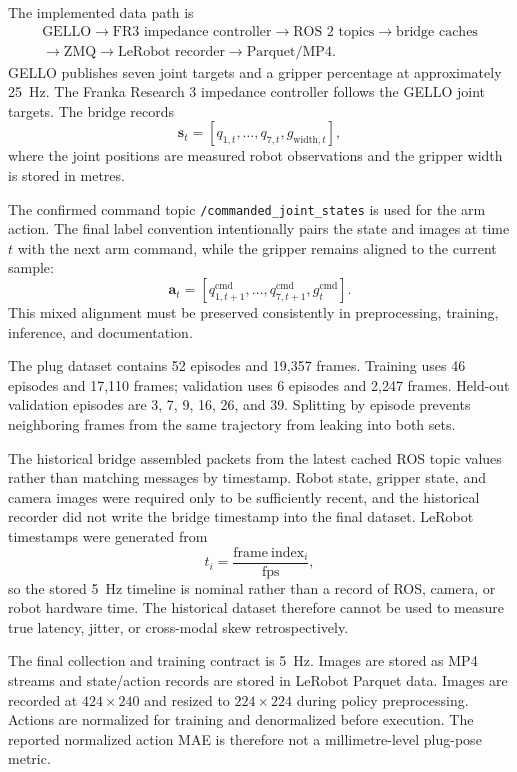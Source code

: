 \documentclass[12pt, letterpaper]{article}
\begin{document}
The implemented data path is
\begin{multline*}
\text{GELLO}
\rightarrow
\text{FR3 impedance controller}
\rightarrow
\text{ROS 2 topics}
\rightarrow
\text{bridge caches}
\\
\rightarrow
\text{ZMQ}
\rightarrow
\text{LeRobot recorder}
\rightarrow
\text{Parquet/MP4}.
\end{multline*}
GELLO publishes seven joint targets and a gripper percentage at approximately 25~Hz. The Franka Research 3 impedance controller follows the GELLO joint targets. The bridge records
\[
\mathbf s_t=[q_{1,t},\ldots,q_{7,t},g_{\mathrm{width},t}],
\]
where the joint positions are measured robot observations and the gripper width is stored in metres.

The confirmed command topic \texttt{/commanded\_joint\_states} is used for the arm action. The final label convention intentionally pairs the state and images at time \(t\) with the next arm command, while the gripper remains aligned to the current sample:
\[
\mathbf a_t=
[q^{\mathrm{cmd}}_{1,t+1},\ldots,
q^{\mathrm{cmd}}_{7,t+1},
g^{\mathrm{cmd}}_{t}].
\]
This mixed alignment must be preserved consistently in preprocessing, training, inference, and documentation.

The plug dataset contains 52 episodes and 19,357 frames. Training uses 46 episodes and 17,110 frames; validation uses 6 episodes and 2,247 frames. Held-out validation episodes are 3, 7, 9, 16, 26, and 39. Splitting by episode prevents neighboring frames from the same trajectory from leaking into both sets.

The historical bridge assembled packets from the latest cached ROS topic values rather than matching messages by timestamp. Robot state, gripper state, and camera images were required only to be sufficiently recent, and the historical recorder did not write the bridge timestamp into the final dataset. LeRobot timestamps were generated from
\[
t_i=\frac{\mathrm{frame\ index}_i}{\mathrm{fps}},
\]
so the stored 5~Hz timeline is nominal rather than a record of ROS, camera, or robot hardware time. The historical dataset therefore cannot be used to measure true latency, jitter, or cross-modal skew retrospectively.

The final collection and training contract is 5~Hz. Images are stored as MP4 streams and state/action records are stored in LeRobot Parquet data. Images are recorded at \(424\times240\) and resized to \(224\times224\) during policy preprocessing. Actions are normalized for training and denormalized before execution. The reported normalized action MAE is therefore not a millimetre-level plug-pose metric.
\end{document}
